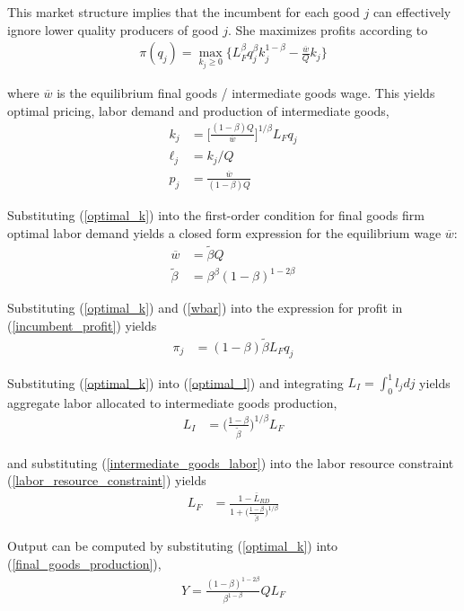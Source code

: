 \documentclass[11pt,english]{article}
\begin{document}
This market structure implies that the incumbent for each good $j$ can effectively ignore lower quality producers of good $j$. She maximizes profits according to
\begin{align}
\pi(q_j) = \max_{k_j \ge 0} \Big\{ L_F^{\beta} q_j^{\beta} k_j^{1-\beta} - \frac{\overline{w}}{Q} k_j \Big\} \label{incumbent_profit}
\end{align}

where $\overline{w}$ is the equilibrium final goods / intermediate goods wage.
This yields optimal pricing, labor demand and production of intermediate goods,
\begin{align}
k_j &= \Big[ \frac{(1-\beta) Q}{\overline{w}} \Big]^{1/\beta}L_F q_j  \label{optimal_k}\\
\ell_j &= k_j / Q \label{optimal_l}\\
p_j &= \frac{\overline{w}}{(1-\beta) Q} \label{optimal_p}
\end{align}

Substituting (\ref{optimal_k}) into the first-order condition for final goods firm optimal labor demand yields a closed form expression for the equilibrium wage $\overline{w}$:
\begin{align}
\overline{w} &= \tilde{\beta} Q \label{wbar} \\
\tilde{\beta} &= \beta^{\beta} (1-\beta)^{1-2\beta} \label{def_cbeta}
\end{align}

Substituting (\ref{optimal_k}) and (\ref{wbar}) into the expression for profit in (\ref{incumbent_profit}) yields
\begin{align}
\pi_j &= (1-\beta) \tilde{\beta} L_F q_j \label{profits_eq}
\end{align}

Substituting (\ref{optimal_k}) into (\ref{optimal_l}) and integrating $L_I = \int_0^1 l_j dj$ yields aggregate labor allocated to intermediate goods production,
\begin{align}
L_I &= \Big( \frac{1-\beta}{\tilde{\beta}} \Big)^{1 / \beta} L_F \label{intermediate_goods_labor}
\end{align}

and substituting (\ref{intermediate_goods_labor}) into the labor resource constraint (\ref{labor_resource_constraint}) yields
\begin{align}
L_F &= \frac{1 - \bar{L}_{RD}}{1 + \Big(\frac{1-\beta}{\tilde{\beta}}\Big)^{1/\beta}}
\end{align}

Output can be computed by substituting (\ref{optimal_k}) into (\ref{final_goods_production}), 
\begin{align}
Y = \frac{(1-\beta)^{1-2\beta}}{\beta^{1-\beta}} Q L_F \label{flow_output}
\end{align}
\end{document}
